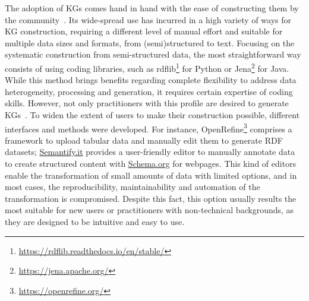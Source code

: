 The adoption of KGs comes hand in hand with the ease of constructing them by the community~\citep{hogan2020twodecades,karger2014semantic}. Its wide-spread use has incurred in a high variety of ways for KG construction, requiring a different level of manual effort and suitable for multiple data sizes and formats, from (semi)structured to text. Focusing on the systematic construction from semi-structured data, the most straightforward way consists of using coding libraries, such as rdflib\footnote{\url{https://rdflib.readthedocs.io/en/stable/}} for Python or Jena\footnote{\url{https://jena.apache.org/}} for Java. While this method brings benefits regarding complete flexibility to address data heterogeneity, processing and generation, it requires certain expertise of coding skills. However, not only practitioners with this profile are desired to generate KGs~\citep{karger2014semantic}. To widen the extent of users to make their construction possible, different interfaces and methods were developed. For instance, OpenRefine\footnote{\url{https://openrefine.org/}} comprises a framework to upload tabular data and manually edit them to generate RDF datasets; \url{Semantify.it} provides a user-friendly editor to manually annotate data to create structured content with \url{Schema.org} for webpages. This kind of editors enable the transformation of small amounts of data with limited options, and in most cases, the reproducibility, maintainability and automation of the transformation is compromised. Despite this fact, this option usually results the most suitable for new users or practitioners with non-technical backgrounds, as they are designed to be intuitive and easy to use. 


